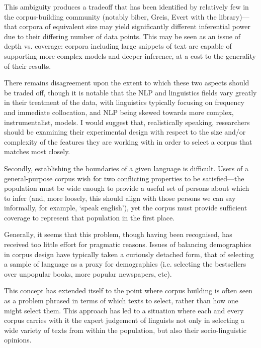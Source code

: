 This ambiguity produces a tradeoff that has been identified by relatively few in the corpus-building community (notably biber, Greis, Evert with the library)---that corpora of equivalent size may yield significantly different inferential power due to their differing number of data points.  This may be seen as an issue of depth vs. coverage: corpora including large snippets of text are capable of supporting more complex models and deeper inference, at a cost to the generality of their results.

There remains disagreement upon the extent to which these two aspects should be traded off, though it is notable that the NLP and linguistics fields vary greatly in their treatment of the data, with linguistics typically focusing on frequency and immediate collocation, and NLP being skewed towards more complex, instrumentalist, models.  I would suggest that, realistically speaking, researchers should be examining their experimental design with respect to the size and/or complexity of the features they are working with in order to select a corpus that matches most closely.



Secondly, establishing the boundaries of a given language is difficult.  Users of a general-purpose corpus wish for two conflicting properties to be satisfied---the population must be wide enough to provide a useful set of persons about which to infer (and, more loosely, this should align with those persons we can say informally, for example, `speak english'), yet the corpus must provide sufficient coverage to represent that population in the first place.

Generally, it seems that this problem, though having been recognised, has received too little effort for pragmatic reasons.  Issues of balancing demographics in corpus design have typically taken a curiously detached form, that of selecting a sample of language as a proxy for demographics (i.e. selecting the bestsellers over unpopular books, more popular newspapers, etc). %

This concept has extended itself to the point where corpus building is often seen as a problem phrased in terms of which texts to select, rather than how one might select them.  This approach has led to a situation where each and every corpus carries with it the expert judgement of linguists not only in selecting a wide variety of texts from within the population, but also their socio-linguistic opinions.

